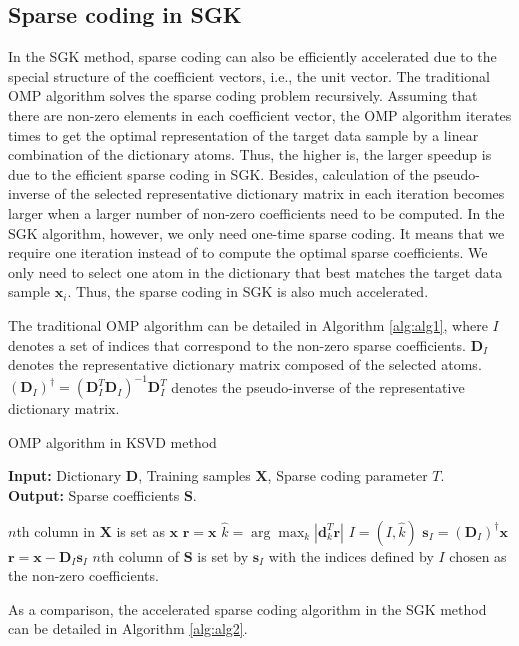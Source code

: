 \subsection{Sparse coding in SGK}
In the SGK method, sparse coding can also be efficiently accelerated  due to the special structure of the coefficient vectors, i.e., the unit vector. The traditional OMP algorithm solves the sparse coding problem recursively. Assuming that there are  non-zero elements in each coefficient vector, the OMP algorithm iterates  times to get the optimal representation of the target data sample by a linear combination of the dictionary atoms. Thus, the higher  is, the larger speedup is due to the efficient sparse coding in SGK. Besides, calculation of the pseudo-inverse of the selected representative dictionary matrix in each iteration becomes larger when a larger number of non-zero coefficients need to be computed.  In the SGK algorithm, however, we only need one-time sparse coding. It means that we require one iteration instead of  to compute the optimal sparse coefficients. We only need to select one atom in the dictionary that best matches the target data sample $\mathbf{x}_i$.  Thus, the sparse coding in SGK is also much accelerated.

The traditional OMP algorithm can be detailed in Algorithm \ref{alg:alg1}, where $I$ denotes a set of indices that correspond to the non-zero sparse coefficients. $\mathbf{D}_I$ denotes the representative dictionary matrix composed of the selected atoms. $(\mathbf{D}_I)^{\dagger}=(\mathbf{D}_I^T\mathbf{D}_I)^{-1}\mathbf{D}_I^T$ denotes the pseudo-inverse of the representative dictionary matrix.


\begin{algorithm}
   \caption{OMP algorithm in KSVD method}
   \textbf{Input:} Dictionary $\mathbf{D}$, Training samples $\mathbf{X}$, Sparse coding parameter $T$. \\
   \textbf{Output:} Sparse coefficients $\mathbf{S}$. 
    \begin{algorithmic}[1]
 \State $n$th column in $\mathbf{X}$ is set as $\mathbf{x}$
 \State  $\mathbf{r}=\mathbf{x}$
     \State $\hat{k}  = \displaystyle\arg\max_{k} |\mathbf{d}_k^T\mathbf{r}|$ 
     \State $I=(I,\hat{k})$
     \State $\mathbf{s}_I=\left(\mathbf{D}_I\right)^{\dagger}\mathbf{x}$
     \State $\mathbf{r}=\mathbf{x} - \mathbf{D}_I \mathbf{s}_I$ 
 \EndFor
  \State  $n$th column of $\mathbf{S}$ is set by $\mathbf{s}_I$ with the indices defined by $I$ chosen as the non-zero coefficients.
 \EndFor       
        
\end{algorithmic}
\label{alg:alg1}
\end{algorithm}
 As a comparison, the accelerated sparse coding algorithm in the SGK method can be detailed in Algorithm \ref{alg:alg2}.

